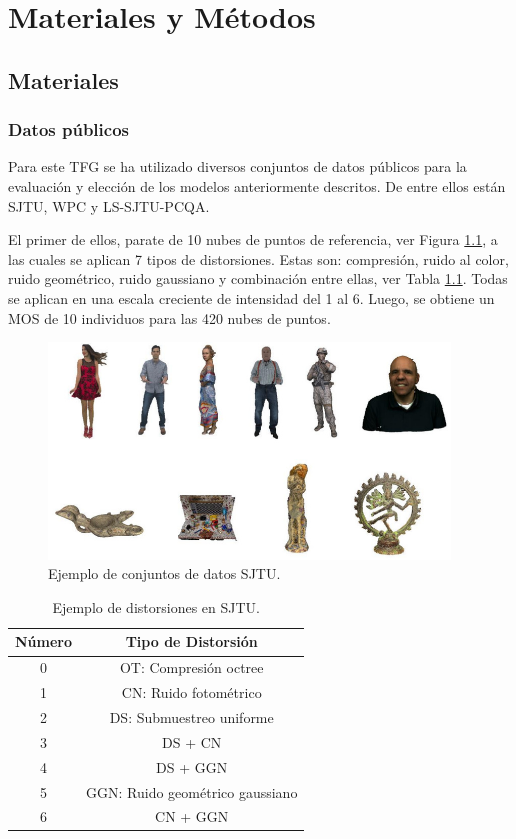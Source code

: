 \chapter{Materiales y Métodos}
\section{Materiales}
\subsection{Datos públicos} 
Para este TFG se ha utilizado diversos conjuntos de datos públicos para la 
evaluación y elección de los modelos anteriormente descritos. De entre ellos 
están SJTU\cite{SJTU}, WPC\cite{WPC1,WPC2} y LS-SJTU-PCQA\cite{ResSCNN}.

El primer de ellos, parate de 10 nubes de puntos de referencia, ver Figura \ref{fig:SJTU}, 
a las cuales se aplican 7 tipos de distorsiones. Estas son: compresión, ruido 
al color, ruido geométrico, ruido gaussiano y combinación entre ellas, ver Tabla \ref{tab:SJTU}. Todas se aplican en una escala creciente
de intensidad del 1 al 6. Luego, se obtiene un MOS de 10 individuos para las 420 
nubes de puntos. 

\begin{figure}[htp]
  \centering 
    \includegraphics[width=0.95\textwidth]{imagenes/chapter4/SJTU}
    \caption{Ejemplo de conjuntos de datos SJTU\cite{SJTU}.}
    \label{fig:SJTU}
\end{figure}

\begin{table}[htp]
  \centering 
  \scriptsize
  \begin{tabular}{|c|c|}
    \hline
    Número & Tipo de Distorsión \\ 
    \hline 
    0 & OT: Compresión octree\cite{OctreeCompression} \\ 
    \hline 
    1 & CN: Ruido fotométrico\\ 
    \hline 
    2 & DS: Submuestreo uniforme \\
    \hline 
    3 & DS + CN \\
    \hline 
    4 & DS + GGN \\
    \hline 
    5 & GGN: Ruido geométrico gaussiano \\
    \hline 
    6 & CN + GGN \\ 
    \hline 
  \end{tabular}
  \caption{Ejemplo de distorsiones en SJTU\cite{SJTU}.}
  \label{tab:SJTU}
\end{table}

